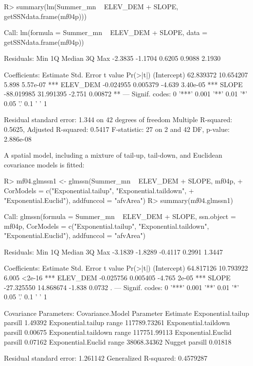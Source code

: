 \documentclass[nojss]{jss}
\renewenvironment{Schunk}{\vspace{\topsep}}{\vspace{\topsep}}
\begin{document}
\begin{Schunk}
\begin{Sinput}
R> summary(lm(Summer_mn ~ ELEV_DEM + SLOPE, getSSNdata.frame(mf04p)))
\end{Sinput}
\begin{Soutput}
Call:
lm(formula = Summer_mn ~ ELEV_DEM + SLOPE, data = getSSNdata.frame(mf04p))

Residuals:
    Min      1Q  Median      3Q     Max 
-2.3835 -1.1704  0.6205  0.9088  2.1930 

Coefficients:
              Estimate Std. Error t value Pr(>|t|)    
(Intercept)  62.839372  10.654207   5.898 5.57e-07 ***
ELEV_DEM     -0.024955   0.005379  -4.639 3.40e-05 ***
SLOPE       -88.019985  31.991395  -2.751  0.00872 ** 
---
Signif. codes:  0 '***' 0.001 '**' 0.01 '*' 0.05 '.' 0.1 ' ' 1

Residual standard error: 1.344 on 42 degrees of freedom
Multiple R-squared:  0.5625,	Adjusted R-squared:  0.5417 
F-statistic:    27 on 2 and 42 DF,  p-value: 2.886e-08
\end{Soutput}
\end{Schunk}

A spatial model, including a mixture of tail-up, tail-down, and Euclidean
covariance models is fitted:

\begin{Schunk}
\begin{Sinput}
R> mf04.glmssn1 <- glmssn(Summer_mn ~ ELEV_DEM + SLOPE, mf04p,
+     CorModels = c("Exponential.tailup", "Exponential.taildown",
+        "Exponential.Euclid"), addfunccol = "afvArea")
R> summary(mf04.glmssn1)
\end{Sinput}
\begin{Soutput}
Call:
glmssn(formula = Summer_mn ~ ELEV_DEM + SLOPE, ssn.object = mf04p, 
    CorModels = c("Exponential.tailup", "Exponential.taildown", 
        "Exponential.Euclid"), addfunccol = "afvArea")

Residuals:
    Min      1Q  Median      3Q     Max 
-3.1839 -1.8289 -0.4117  0.2991  1.3447 

Coefficients:
              Estimate Std. Error t value Pr(>|t|)    
(Intercept)  64.817126  10.793922   6.005   <2e-16 ***
ELEV_DEM     -0.025756   0.005405  -4.765    2e-05 ***
SLOPE       -27.325550  14.868674  -1.838   0.0732 .  
---
Signif. codes:  0 '***' 0.001 '**' 0.01 '*' 0.05 '.' 0.1 ' ' 1

Covariance Parameters:
     Covariance.Model Parameter     Estimate
   Exponential.tailup   parsill      1.49392
   Exponential.tailup     range 117789.73261
 Exponential.taildown   parsill      0.00675
 Exponential.taildown     range 117751.99113
   Exponential.Euclid   parsill      0.07162
   Exponential.Euclid     range  38068.34362
               Nugget   parsill      0.01818

Residual standard error: 1.261142
Generalized R-squared: 0.4579287
\end{Soutput}
\end{Schunk}
\end{document}
